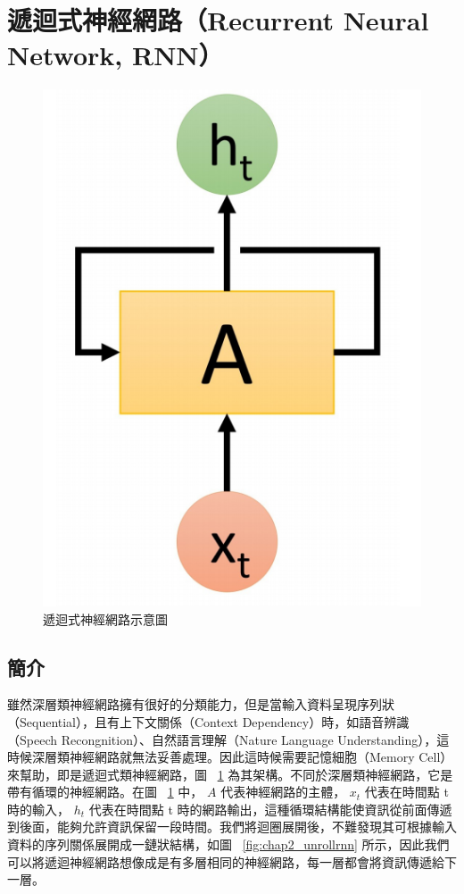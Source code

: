 \section{遞迴式神經網路（Recurrent Neural Network, RNN）}
\begin{figure}[b]
    \centering
    \includegraphics[scale=0.25]{images/chap2_rnn.png}
    \caption{遞迴式神經網路示意圖\cite{shen2016} }\label{fig:chap2_rnn}
\end{figure}
\subsection{簡介}
雖然深層類神經網路擁有很好的分類能力，但是當輸入資料呈現序列狀（Sequential），且有上下文關係（Context Dependency）時，如語音辨識（Speech Recongnition）、自然語言理解（Nature Language Understanding），這時候深層類神經網路就無法妥善處理。因此這時候需要記憶細胞（Memory Cell）來幫助，即是遞迴式類神經網路，圖 ~\ref{fig:chap2_rnn} 為其架構。不同於深層類神經網路，它是帶有循環的神經網路。在圖 ~\ref{fig:chap2_rnn} 中， $A$ 代表神經網路的主體， $x_t$ 代表在時間點 t 時的輸入， $h_t$ 代表在時間點 t 時的網路輸出，這種循環結構能使資訊從前面傳遞到後面，能夠允許資訊保留一段時間。我們將迴圈展開後，不難發現其可根據輸入資料的序列關係展開成一鏈狀結構，如圖 ~\ref{fig:chap2_unrollrnn} 所示，因此我們可以將遞迴神經網路想像成是有多層相同的神經網路，每一層都會將資訊傳遞給下一層。

